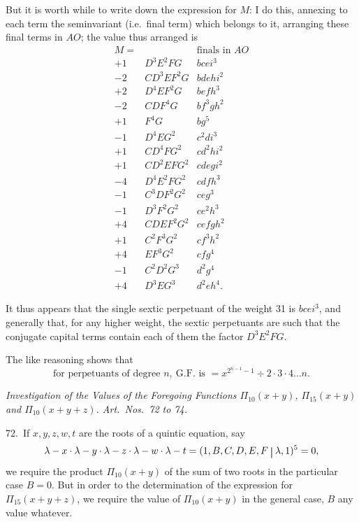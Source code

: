\documentclass[11pt]{article}
\begin{document}
\clearpage
But it is worth while to write down the expression for $M$: I do this, annexing to each term the seminvariant (i.e.\ final term) which belongs to it, arranging these final terms in $AO$; the value thus arranged is
\[
\begin{array}{rll}
M = & & \text{finals in } AO \\
+ 1 & D^3E^2FG & bcei^3 \\
- 2 & CD^3EF^2G & bdehi^2 \\
+ 2 & D^4EF^2G & befh^3 \\
- 2 & CDF^4G & bf^3gh^2 \\
+ 1 & F^4G & bg^5 \\
- 1 & D^4EG^2 & c^2di^3 \\
+ 1 & CD^4FG^2 & cd^2hi^2 \\
+ 1 & CD^2EFG^2 & cdegi^2 \\
- 4 & D^4E^2FG^2 & cdfh^3 \\
- 1 & C^3DF^2G^2 & ceg^3 \\
- 1 & D^3F^2G^2 & ce^2h^3 \\
+ 4 & CDEF^2G^2 & cefgh^2 \\
+ 1 & C^2F^3G^2 & cf^3h^2 \\
+ 4 & EF^3G^2 & cfg^4 \\
- 1 & C^2D^2G^3 & d^2g^4 \\
+ 4 & D^3EG^3 & d^2eh^4.
\end{array}
\]

It thus appears that the single sextic perpetuant of the weight 31 is $bcei^3$, and generally that, for any higher weight, the sextic perpetuants are such that the conjugate capital terms contain each of them the factor $D^3E^2FG$.

The like reasoning shows that
\[
\text{for perpetuants of degree } n,\ \text{G.F.\ is } = x^{2^{n-1}-1} \div 2 \cdot 3 \cdot 4 \ldots n.
\]

\medskip
\begin{center}
\textit{Investigation of the Values of the Foregoing Functions $\Pi_{10}(x + y)$, $\Pi_{15}(x + y)$ and $\Pi_{10}(x + y + z)$. Art.\ Nos.\ 72 to 74.}
\end{center}

72.\ If $x, y, z, w, t$ are the roots of a quintic equation, say
\[
\lambda - x \cdot \lambda - y \cdot \lambda - z \cdot \lambda - w \cdot \lambda - t = (1, B, C, D, E, F\,\,\rule[-1ex]{0.6pt}{2.5ex}\,\,\lambda, 1)^5 = 0,
\]
we require the product $\Pi_{10}(x + y)$ of the sum of two roots in the particular case $B = 0$. But in order to the determination of the expression for $\Pi_{15}(x + y + z)$, we require the value of $\Pi_{10}(x + y)$ in the general case, $B$ any value whatever.
\end{document}
